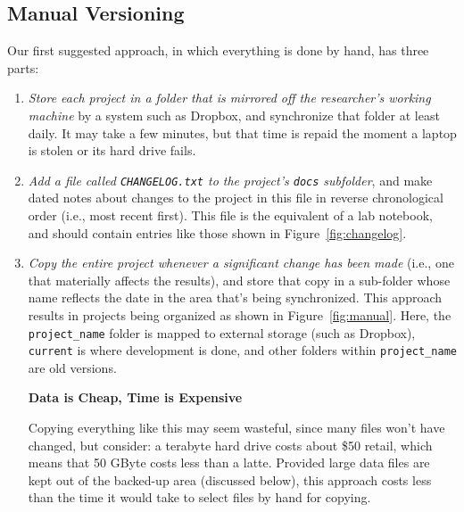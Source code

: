 \documentclass[10pt]{article}
\newcommand{\recommend}[1]{\textit{#1}}
\begin{document}
\subsection*{Manual Versioning}

Our first suggested approach, in which everything is done by hand, has
three parts:

\begin{enumerate}

\item
  \recommend{Store each project in a folder that is mirrored off the
    researcher's working machine} by a system such as Dropbox, and
  synchronize that folder at least daily. It may take a few minutes,
  but that time is repaid the
  moment a laptop is stolen or its hard drive fails.

\item
  \recommend{Add a file called \texttt{CHANGELOG.txt} to the project's
    \texttt{docs} subfolder}, and make dated notes about changes to
  the project in this file in reverse chronological order (i.e., most
  recent first). This file is the equivalent of a lab notebook, and
  should contain entries like those shown in
  Figure~\ref{fig:changelog}.

\item
  \recommend{Copy the entire project whenever a significant change has
    been made} (i.e., one that materially affects the results), and store that 
    copy in a sub-folder whose name reflects
  the date in the area that's being synchronized. This approach
  results in projects being organized as shown in
  Figure~\ref{fig:manual}.  Here, the \texttt{project\_name} folder is
  mapped to external storage (such as Dropbox), \texttt{current} is
  where development is done, and other folders within
  \texttt{project\_name} are old versions.

  \begin{framed}
    \noindent \textbf{Data is Cheap, Time is Expensive}

    Copying everything like this may seem wasteful, since many files
    won't have changed, but consider: a terabyte hard drive costs
    about \$50 retail, which means that 50 GByte costs less than a
    latte. Provided large data files are kept out of the backed-up
    area (discussed below), this approach costs less than the time it
    would take to select files by hand for copying.
  \end{framed}

\end{enumerate}
\end{document}
